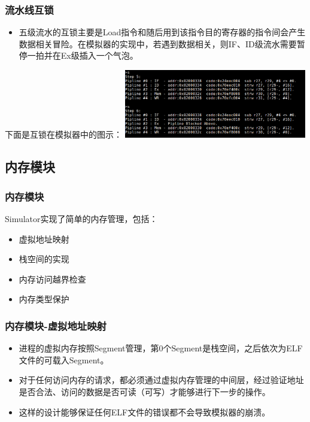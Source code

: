 \documentclass[CJK]{beamer}
\begin{document}
\begin{CJK}{UTF8}{gbsn}
\begin{frame}[fragile]
	\frametitle{流水线互锁}
	\begin{itemize}
		\item 五级流水的互锁主要是Load指令和随后用到该指令目的寄存器的指令间会产生数据相关冒险。在模拟器的实现中，若遇到数据相关，则IF、ID级流水需要暂停一拍并在Ex级插入一个气泡。
	\end{itemize}
	下面是互锁在模拟器中的图示：
	\includegraphics[height=3cm]{pipline_block.jpeg}
\end{frame}

\subsection{内存模块}
\begin{frame}[fragile]
	\frametitle{内存模块}
	Simulator实现了简单的内存管理，包括：
	\begin{itemize}
		\item 虚拟地址映射
		\item 栈空间的实现
		\item 内存访问越界检查
		\item 内存类型保护
	\end{itemize}
\end{frame}

\begin{frame}[fragile]
	\frametitle{内存模块-虚拟地址映射}
	\begin{itemize}
		\item 进程的虚拟内存按照Segment管理，第0个Segment是栈空间，之后依次为ELF文件的可载入Segment。
		\item 对于任何访问内存的请求，都必须通过虚拟内存管理的中间层，经过验证地址是否合法、访问的数据是否可读（可写）才能够进行下一步的操作。
		\item 这样的设计能够保证任何ELF文件的错误都不会导致模拟器的崩溃。
	\end{itemize}
\end{frame}


\end{CJK}
\end{document}

